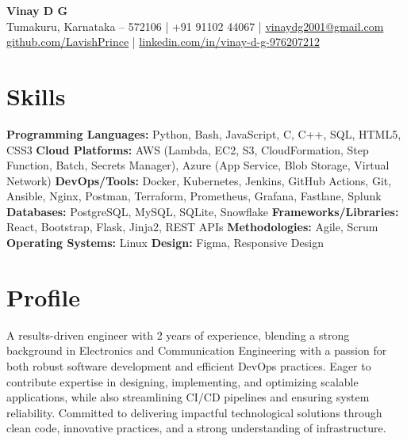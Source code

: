 \documentclass[a4paper,10pt]{article}
\begin{document}
\textbf{\Large Vinay D G} \\Tumakuru, Karnataka – 572106 \quad | \quad +91 91102 44067 \quad | \quad \href{mailto:vinaydg2001@gmail.com}{vinaydg2001@gmail.com} \\\href{https://github.com/LavishPrince}{github.com/LavishPrince} \quad | \quad \href{https://www.linkedin.com/in/vinay-d-g-976207212/}{linkedin.com/in/vinay-d-g-976207212}

\section*{Skills}
\textbf{Programming Languages:} Python, Bash, JavaScript, C, C++, SQL, HTML5, CSS3
\textbf{Cloud Platforms:} AWS (Lambda, EC2, S3, CloudFormation, Step Function, Batch, Secrets Manager), Azure (App Service, Blob Storage, Virtual Network)
\textbf{DevOps/Tools:} Docker, Kubernetes, Jenkins, GitHub Actions, Git, Ansible, Nginx, Postman, Terraform, Prometheus, Grafana, Fastlane, Splunk
\textbf{Databases:} PostgreSQL, MySQL, SQLite, Snowflake
\textbf{Frameworks/Libraries:} React, Bootstrap, Flask, Jinja2, REST APIs
\textbf{Methodologies:} Agile, Scrum
\textbf{Operating Systems:} Linux
\textbf{Design:} Figma, Responsive Design

\section*{Profile}
A results-driven engineer with 2 years of experience, blending a strong background in Electronics and Communication Engineering with a passion for both robust software development and efficient DevOps practices. Eager to contribute expertise in designing, implementing, and optimizing scalable applications, while also streamlining CI/CD pipelines and ensuring system reliability. Committed to delivering impactful technological solutions through clean code, innovative practices, and a strong understanding of infrastructure.

\end{document}
